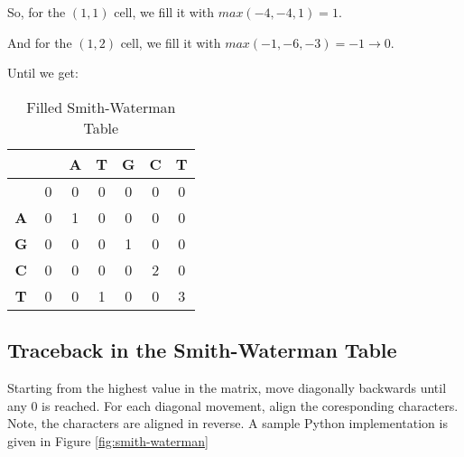 So, for the $(1,1)$ cell, we fill it with $max(-4,-4,1) = 1$.

And for the $(1,2)$ cell, we fill it with $max(-1,-6,-3) = -1 \rightarrow 0$.


Until we get:

\begin{table}[htbp]
    \centering
    \begin{tabular}{|c|c|c|c|c|c|c|}
        \hline
          & $\phantom{\textbf{A}}$ & \textbf{A} & \textbf{T} & \textbf{G} & \textbf{C} & \textbf{T} \\
        \hline
        & 0 & 0 & 0 & 0 & 0 & 0 \\
        \hline
        \textbf{A} & 0 & 1 & 0 & 0 & 0 & 0 \\
        \hline
        \textbf{G} & 0 & 0 & 0 & 1 & 0 & 0 \\
        \hline
        \textbf{C} & 0 & 0 & 0 & 0 & 2 & 0 \\
        \hline
        \textbf{T} & 0 & 0 & 1 & 0 & 0 & 3 \\
        \hline
    \end{tabular}
    \caption{Filled Smith-Waterman Table}
\end{table}

\subsection{Traceback in the Smith-Waterman Table}

Starting from the highest value in the matrix, move diagonally backwards until any 0 is reached.
For each diagonal movement, align the coresponding characters.
Note, the characters are aligned in reverse.
A sample Python implementation is given in Figure \ref{fig:smith-waterman}

